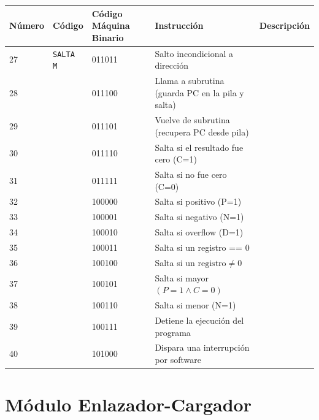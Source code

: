 \documentclass{article}
\begin{document}
\begin{table}[H]
    \centering
    \begin{tabular}{|p{1.3cm}|p{3cm}|p{1.6cm}|p{5cm}|p{4cm}|}
    \hline
    \textbf{Número} & \textbf{Código} & \textbf{Código Máquina Binario} & \textbf{Instrucción} & \textbf{Descripción} \\
    \hline
    27 & \texttt{SALTA M} & 011011 & Salto incondicional a dirección & \\
    \hline
    28 & & 011100 & Llama a subrutina (guarda PC en la pila y salta) & \\
    \hline
    29 & & 011101 & Vuelve de subrutina (recupera PC desde pila) & \\
    \hline
    30 & & 011110 & Salta si el resultado fue cero (C=1) & \\
    \hline
    31 & & 011111 & Salta si no fue cero (C=0) & \\
    \hline
    32 & & 100000 & Salta si positivo (P=1) & \\
    \hline
    33 & & 100001 & Salta si negativo (N=1) & \\
    \hline
    34 & & 100010 & Salta si overflow (D=1) & \\
    \hline
    35 & & 100011 & Salta si un registro == 0 & \\
    \hline
    36 & & 100100 & Salta si un $\text{registro} \neq 0$ & \\
    \hline
    37 & & 100101 & Salta si mayor $(P = 1 \land C = 0)$ & \\
    \hline
    38 & & 100110 & Salta si menor (N=1) & \\
    \hline
    39 & & 100111 & Detiene la ejecución del programa & \\
    \hline
    40 & & 101000 & Dispara una interrupción por software & \\
    \hline
    \end{tabular}
\end{table}



\section{Módulo Enlazador-Cargador}

\end{document}
